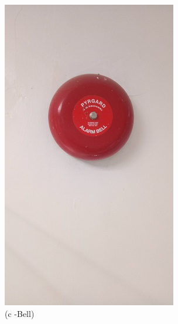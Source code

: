 \begin{figure}
\begin{minipage}[b]{0.2\linewidth}
			\includegraphics[width=\textwidth]{figures/R1P_fdas/bell}
		\caption*{(c -Bell)}
	\end{minipage}
	\hspace{0.05cm}
\begin{minipage}[b]{0.2\linewidth}
	\centering

\end{minipage}
\end{figure}
